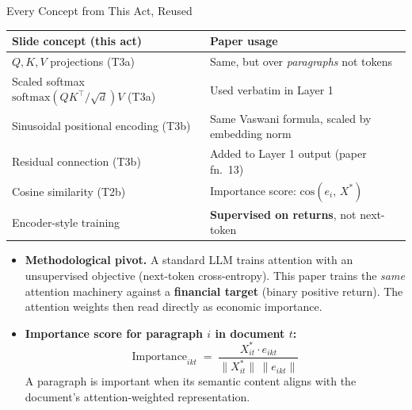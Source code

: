 \begin{frame}{Every Concept from This Act, Reused}
\centering
\renewcommand{\arraystretch}{1.25}
\footnotesize
\begin{tabular}{l l}
\toprule
\textbf{Slide concept (this act)} & \textbf{Paper usage} \\
\midrule
$Q, K, V$ projections (T3a)                  & Same, but over \emph{paragraphs} not tokens \\
Scaled softmax $\mathrm{softmax}(QK^{\top}/\sqrt{d})V$ (T3a) & Used verbatim in Layer 1 \\
Sinusoidal positional encoding (T3b)         & Same Vaswani formula, scaled by embedding norm \\
Residual connection (T3b)                    & Added to Layer 1 output (paper fn.\ 13) \\
Cosine similarity (T2b)                      & Importance score: $\mathrm{cos}(e_i,\, X^{*})$ \\
Encoder-style training                       & \textbf{Supervised on returns}, not next-token \\
\bottomrule
\end{tabular}

\medskip
\begin{itemize}
\item \textbf{Methodological pivot.} A standard LLM trains attention with an unsupervised objective (next-token cross-entropy). This paper trains the \emph{same} attention machinery against a \textbf{financial target} (binary positive return). The attention weights then read directly as economic importance.

\medskip
\item \textbf{Importance score for paragraph $i$ in document $t$:}
\[
   \boxed{\;\;\text{Importance}_{ikt} \;=\; \frac{X_{it}^{*} \cdot e_{ikt}}{\|X_{it}^{*}\|\,\|e_{ikt}\|}\;\;}
\]
A paragraph is important when its semantic content aligns with the document's attention-weighted representation.
\end{itemize}
\end{frame}

